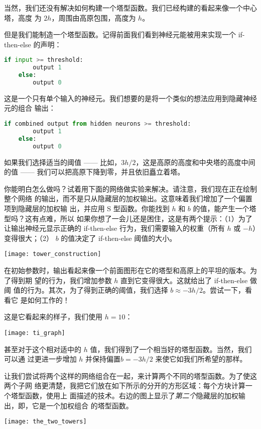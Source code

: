 当然，我们还没有解决如何构建一个塔型函数。我们已经构建的看起来像一个中心塔，高度
为 $2h$，周围由高原包围，高度为 $h$。

但是我们能制造一个塔型函数。记得前面我们看到神经元能被用来实现一个 {\serif
  if-then-else} 的声明：
\begin{lstlisting}[language=Python]
    if input >= threshold: 
        output 1
    else:
        output 0
\end{lstlisting}

这是一个只有单个输入的神经元。我们想要的是将一个类似的想法应用到隐藏神经元的组合
输出：
\begin{lstlisting}[language=Python]
    if combined output from hidden neurons >= threshold:
        output 1
    else:
        output 0
\end{lstlisting}

如果我们选择适当的阈值 —— 比如，$3h/2$，这是高原的高度和中央塔的高度中间的值 ——
我们可以把高原下降到零，并且依旧矗立着塔。

你能明白怎么做吗？试着用下面的网络做实验来解决。请注意，我们现在正在绘制整个网络
的输出，而不是只从隐藏层的加权输出。这意味着我们增加了一个偏置项到隐藏层的加权输
出，并应用 S 型函数。你能找到 $h$ 和 $b$ 的值，能产生一个塔型吗？这有点难，所以
如果你想了一会儿还是困住，这是有两个提示：（1）为了让输出神经元显示正确的
{\serif if-then-else} 行为，我们需要输入的权重（所有 $h$ 或 $-h$）变得很大；（2）
$b$ 的值决定了 {\serif if-then-else} 阈值的大小。
\begin{center}
  \texttt{[image: tower\_construction]}
\end{center}

在初始参数时，输出看起来像一个前面图形在它的塔型和高原上的平坦的版本。为了得到期
望的行为，我们增加参数 $h$ 直到它变得很大。这就给出了 {\serif if-then-else} 做阈
值的行为。其次，为了得到正确的阈值，我们选择 $b \approx -3h/2$。尝试一下，看看它
是如何工作的！

这是它看起来的样子，我们使用 $h = 10$：
\begin{center}
  \texttt{[image: ti\_graph]}
\end{center}

甚至对于这个相对适中的 $h$ 值，我们得到了一个相当好的塔型函数。当然，我们可以通
过更进一步增加 $h$ 并保持偏置$b = -3h/2$ 来使它如我们所希望的那样。

让我们尝试将两个这样的网络组合在一起，来计算两个不同的塔型函数。为了使这两个子网
络更清楚，我把它们放在如下所示的分开的方形区域：每个方块计算一个塔型函数，使用上
面描述的技术。右边的图上显示了\emph{第二个}隐藏层的加权输出，即，它是一个加权组合
的塔型函数。
\begin{center}
  \texttt{[image: the\_two\_towers]}
\end{center}

